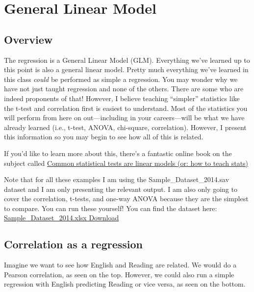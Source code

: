 \documentclass[
]{book}
\begin{document}
\hypertarget{general-linear-model}{%
\section{General Linear Model}\label{general-linear-model}}

\hypertarget{overview-12}{%
\subsection{Overview}\label{overview-12}}

The regression is a General Linear Model (GLM). Everything we've learned up to this point is also a general linear model. Pretty much everything we've learned in this class \emph{could} be performed as simple a regression. You may wonder why we have not just taught regression and none of the others. There are some who are indeed proponents of that! However, I believe teaching ``simpler'' statistics like the t-test and correlation first is easiest to understand. Most of the statistics you will perform from here on out---including in your careers---will be what we have already learned (i.e., t-test, ANOVA, chi-square, correlation). However, I present this information so you may begin to see how all of this is related.

If you'd like to learn more about this, there's a fantastic online book on the subject called \href{https://lindeloev.github.io/tests-as-linear/}{Common statistical tests are linear models (or: how to teach stats)}

Note that for all these examples I am using the Sample\_Dataset\_2014.sav dataset and I am only presenting the relevant output. I am also only going to cover the correlation, t-tests, and one-way ANOVA because they are the simplest to compare. You can run these yourself! You can find the dataset here: \href{https://github.com/danawanzer/stats-with-jamovi/blob/master/data/Sample_Dataset_2014.xlsx}{Sample\_Dataset\_2014.xlsx Download}

\hypertarget{correlation-as-a-regression}{%
\subsection{Correlation as a regression}\label{correlation-as-a-regression}}

Imagine we want to see how English and Reading are related. We would do a Pearson correlation, as seen on the top. However, we could also run a simple regression with English predicting Reading or vice versa, as seen on the bottom.
\end{document}
